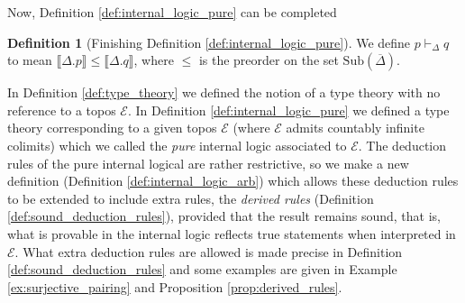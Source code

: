 \documentclass{birkjour}
\theoremstyle{plain}
\theoremstyle{definition}
\newtheorem{definition}[thm]{Definition} %
\newcommand{\call}[1]{\mathcal{#1}}
\begin{document}
	Now, Definition \ref{def:internal_logic_pure} can be completed
	\begin{definition}[Finishing Definition \ref{def:internal_logic_pure}]
		We define $p \vdash_{\Delta} q$ to mean $\llbracket \Delta . p \rrbracket \leq \llbracket \Delta . q \rrbracket$, where $\leq$ is the preorder on the set $\text{Sub}(\overline{\Delta})$.
	\end{definition}
	In Definition \ref{def:type_theory} we defined the notion of a type theory with no reference to a topos $\call{E}$. In Definition \ref{def:internal_logic_pure} we defined a type theory corresponding to a given topos $\call{E}$ (where $\call{E}$ admits countably infinite colimits) which we called the \emph{pure} internal logic associated to $\call{E}$. The deduction rules of the pure internal logical are rather restrictive, so we make a new definition (Definition \ref{def:internal_logic_arb}) which allows these deduction rules to be extended to include extra rules, the \emph{derived rules} (Definition \ref{def:sound_deduction_rules}), provided that the result remains sound, that is, what is provable in the internal logic reflects true statements when interpreted in $\call{E}$. What extra deduction rules are allowed is made precise in Definition \ref{def:sound_deduction_rules} and some examples are given in Example \ref{ex:surjective_pairing} and Proposition \ref{prop:derived_rules}.
\end{document}
